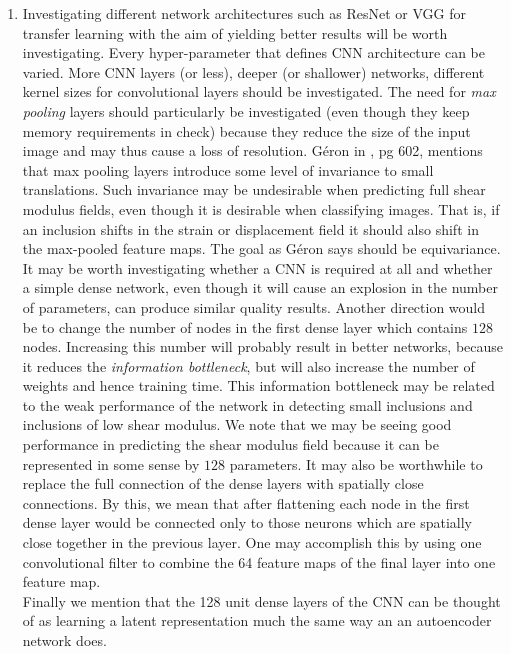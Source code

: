 \documentclass[12pt]{article}
\begin{document}
\begin{enumerate}
\item{Investigating different network architectures such as ResNet \cite{conf:resnet} or VGG \cite{conf:vgg} for transfer learning with the aim of yielding better results will be worth investigating. Every hyper-parameter that defines CNN architecture can be varied. More CNN layers (or less), deeper (or shallower) networks, different kernel sizes for convolutional layers should be investigated. The need for \textit{max pooling} layers should particularly be investigated (even though they keep memory requirements in check) because they reduce the size of the input image and may thus cause a loss of resolution. G\'{e}ron in \cite{book:geron2019}, pg 602, mentions that max pooling layers introduce some level of invariance to small translations. Such invariance may be undesirable when predicting full shear modulus fields, even though it is desirable when classifying images. That is, if an inclusion shifts in the strain or displacement field it should also shift in the max-pooled feature maps. The goal as G\'{e}ron says should be equivariance. It may be worth investigating whether a CNN is required at all and whether a simple dense network, even though it will cause an explosion in the number of parameters, can produce similar quality results. Another direction would be to change the number of nodes in the first dense layer which contains $128$ nodes. Increasing this number will probably result in better networks, because it reduces the \textit{information bottleneck}\cite{book:chollet}, but will also increase the number of weights and hence training time. This information bottleneck may be related to the weak performance of the network in detecting small inclusions and inclusions of low shear modulus. We note that we may be seeing good performance in predicting the shear modulus field because it can be represented in some sense by $128$ parameters. It may also be worthwhile to replace the full connection of the dense layers with spatially close connections. By this, we mean that after flattening each node in the first dense layer would be connected only to those neurons which are spatially close together in the previous layer. One may accomplish this by using one convolutional filter to combine the 64 feature maps of the final layer into one feature map.\\ Finally we mention that the 128 unit dense layers of the CNN can be thought of as learning a latent representation much the same way an an autoencoder network does.\\
}
\end{enumerate}
\end{document}
